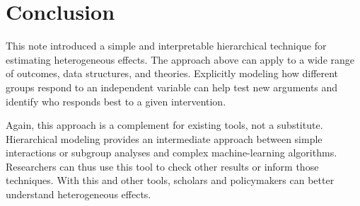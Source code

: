 \documentclass[12pt]{article}
\begin{document}
\section{Conclusion}

This note introduced a simple and interpretable hierarchical technique for estimating heterogeneous effects. 
The approach above can apply to a wide range of outcomes, data structures, and theories. 
Explicitly modeling how different groups respond to an independent variable can help test new arguments and identify who responds best to a given intervention. 


Again, this approach is a complement for existing tools, not a substitute. 
Hierarchical modeling provides an intermediate approach between simple interactions or subgroup analyses and complex machine-learning algorithms. 
Researchers can thus use this tool to check other results or inform those techniques.
With this and other tools, scholars and policymakers can better understand heterogeneous effects.


\singlespace
 
 
\end{document}
